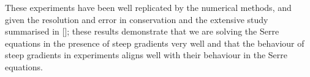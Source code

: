 These experiments have been well replicated by the numerical methods, and given the resolution and error in conservation and the extensive study summarised in []; these results demonstrate that we are solving the Serre equations in the presence of steep gradients very well and that the behaviour of steep gradients in experiments aligns well with their behaviour in the Serre equations. 




     
